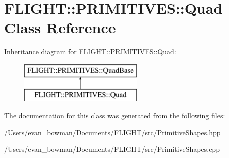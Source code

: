 \hypertarget{class_f_l_i_g_h_t_1_1_p_r_i_m_i_t_i_v_e_s_1_1_quad}{}\section{F\+L\+I\+G\+HT\+:\+:P\+R\+I\+M\+I\+T\+I\+V\+ES\+:\+:Quad Class Reference}
\label{class_f_l_i_g_h_t_1_1_p_r_i_m_i_t_i_v_e_s_1_1_quad}
Inheritance diagram for F\+L\+I\+G\+HT\+:\+:P\+R\+I\+M\+I\+T\+I\+V\+ES\+:\+:Quad\+:\begin{figure}[H]
\begin{center}
\leavevmode
\includegraphics[height=2.000000cm]{class_f_l_i_g_h_t_1_1_p_r_i_m_i_t_i_v_e_s_1_1_quad}
\end{center}
\end{figure}


The documentation for this class was generated from the following files\+:\begin{DoxyCompactItemize}
\item 
/\+Users/evan\+\_\+bowman/\+Documents/\+F\+L\+I\+G\+H\+T/src/Primitive\+Shapes.\+hpp\item 
/\+Users/evan\+\_\+bowman/\+Documents/\+F\+L\+I\+G\+H\+T/src/Primitive\+Shapes.\+cpp\end{DoxyCompactItemize}
